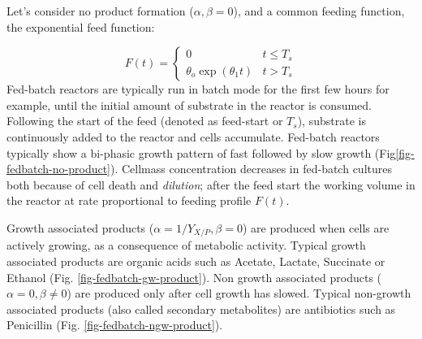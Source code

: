 \documentclass[11pt]{article}
\theoremstyle{definition}
\begin{document}
Let's consider no product formation ($\alpha,\beta= 0$), and a common feeding function, the exponential feed function:

\begin{equation}
	F\left(t\right) =
	\begin{cases}
      0 & t\leq T_{s} \\
      \theta_{o}\exp\left(\theta_{1}t\right) & t>T_{s}
   \end{cases}
\end{equation}
Fed-batch reactors are typically run in batch mode for the first few hours for example, until the initial amount of substrate in the reactor is consumed.
Following the start of the feed (denoted as feed-start or $T_{s}$), substrate is continuously added to the reactor and cells accumulate.
Fed-batch reactors typically show a bi-phasic growth pattern of fast followed by slow growth (Fig\ref{fig-fedbatch-no-product}).
Cellmass concentration decreases in fed-batch cultures both because of cell death and \textit{dilution}; after the feed start the working volume in the reactor  at rate proportional to feeding profile $F(t)$.
\begin{figure*}[!h]\centering
{}
\caption{Fed-batch growth of simple cells in a well-mixed bioreactor as a function of time with no product formation. The x-axis denotes the fermentation tile while the y-axis denotes the cellmass [gdw/L] or substrate [mmol/L] concentration.
The reactor is run in batch mode until the substrate is nearly exhausted, then the feed is started in the reactor. The feed-profile for this simulation is given
by a simple exponential ramp. }\label{fig-fedbatch-no-product}
\end{figure*}
Growth associated products ($\alpha = 1/Y_{X/P}, \beta = 0$) are produced when cells are actively growing, as a consequence of metabolic activity.
Typical growth associated products are organic acids such as Acetate, Lactate, Succinate or Ethanol (Fig. \ref{fig-fedbatch-gw-product}).
Non growth associated products ($\alpha = 0, \beta \neq 0$) are produced only after cell growth has slowed.
Typical non-growth associated products (also called secondary metabolites) are antibiotics such as Penicillin (Fig. \ref{fig-fedbatch-ngw-product}).

\begin{figure*}[!h]\centering
{}
\caption{Fed-batch growth of simple cells in a well-mixed bioreactor as a function of time with growth associated product formation. The x-axis denotes the fermentation tile while the y-axis denotes the cellmass [gdw/L] or substrate [mmol/L] concentration.
The reactor is run in batch mode until the substrate is nearly exhausted, then the feed is started in the reactor. The feed-profile for this simulation is given
by a simple exponential ramp.}\label{fig-fedbatch-gw-product}
\end{figure*}
\end{document}
